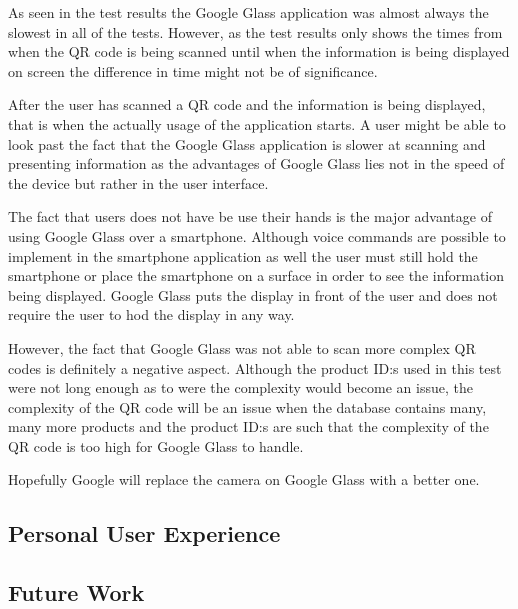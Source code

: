 As seen in the test results the Google Glass application was almost always the slowest in all of the tests. However, as the test results only shows the times from when the QR code is being scanned until when the information is being displayed on screen the difference in time might not be of significance. 

After the user has scanned a QR code and the information is being displayed, that is when the actually usage of the application starts. A user might be able to look past the fact that the Google Glass application is slower at scanning and presenting information as the advantages of Google Glass lies not in the speed of the device but rather in the user interface.

The fact that users does not have be use their hands is the major advantage of using Google Glass over a smartphone. Although voice commands are possible to implement in the smartphone application as well the user must still hold the smartphone or place the smartphone on a surface in order to see the information being displayed. Google Glass puts the display in front of the user and does not require the user to hod the display in any way.

However, the fact that Google Glass was not able to scan more complex QR codes is definitely a negative aspect. Although the product ID:s used in this test were not long enough as to were the complexity would become an issue, the complexity of the QR code will be an issue when the database contains many, many more products and the product ID:s are such that the complexity of the QR code is too high for Google Glass to handle.

Hopefully Google will replace the camera on Google Glass with a better one. 

\subsection{Personal User Experience}
\label{subsec:personalexperience}


\subsection{Future Work}
\label{subsec:futurework}
